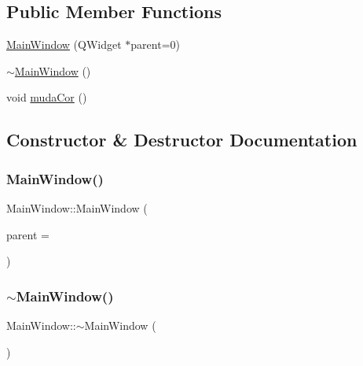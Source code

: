 \subsection*{Public Member Functions}
\begin{DoxyCompactItemize}
\item 
\hyperlink{class_main_window_a8b244be8b7b7db1b08de2a2acb9409db}{Main\+Window} (Q\+Widget $\ast$parent=0)
\item 
\hyperlink{class_main_window_ae98d00a93bc118200eeef9f9bba1dba7}{$\sim$\+Main\+Window} ()
\item 
void \hyperlink{class_main_window_ad82150906607387d5801606dba6495ac}{muda\+Cor} ()
\end{DoxyCompactItemize}


\subsection{Constructor \& Destructor Documentation}
\mbox{\label{class_main_window_a8b244be8b7b7db1b08de2a2acb9409db}} 
\subsubsection{\texorpdfstring{Main\+Window()}{MainWindow()}}
{\footnotesize\ttfamily Main\+Window\+::\+Main\+Window (\begin{DoxyParamCaption}\item[{Q\+Widget $\ast$}]{parent = {} }\end{DoxyParamCaption})\hspace{0.3cm}{\ttfamily [explicit]}}

\mbox{\label{class_main_window_ae98d00a93bc118200eeef9f9bba1dba7}} 
\subsubsection{\texorpdfstring{$\sim$\+Main\+Window()}{~MainWindow()}}
{\footnotesize\ttfamily Main\+Window\+::$\sim$\+Main\+Window (\begin{DoxyParamCaption}{ }\end{DoxyParamCaption})}



